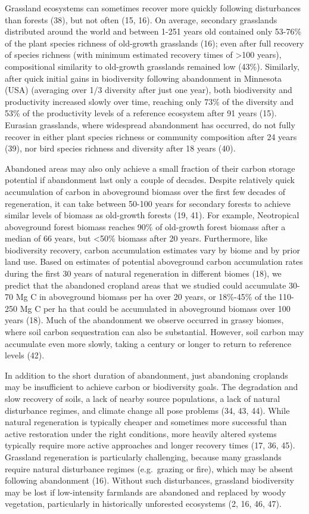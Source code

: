 \documentclass[9pt,twocolumn,twoside,]{pnas-new}
\begin{document}
Grassland ecosystems can sometimes recover more quickly following
disturbances than forests (38), but not often (15, 16). On average,
secondary grasslands distributed around the world and between 1-251
years old contained only 53-76\% of the plant species richness of
old-growth grasslands (16); even after full recovery of species richness
(with minimum estimated recovery times of \textgreater100 years),
compositional similarity to old-growth grasslands remained low (43\%).
Similarly, after quick initial gains in biodiversity following
abandonment in Minnesota (USA) (averaging over 1/3 diversity after just
one year), both biodiversity and productivity increased slowly over
time, reaching only 73\% of the diversity and 53\% of the productivity
levels of a reference ecosystem after 91 years (15). Eurasian
grasslands, where widespread abandonment has occurred, do not fully
recover in either plant species richness or community composition after
24 years (39), nor bird species richness and diversity after 18 years
(40).

Abandoned areas may also only achieve a small fraction of their carbon
storage potential if abandonment last only a couple of decades. Despite
relatively quick accumulation of carbon in aboveground biomass over the
first few decades of regeneration, it can take between 50-100 years for
secondary forests to achieve similar levels of biomass as old-growth
forests (19, 41). For example, Neotropical aboveground forest biomass
reaches 90\% of old-growth forest biomass after a median of 66 years,
but \textless50\% biomass after 20 years. Furthermore, like biodiversity
recovery, carbon accumulation estimates vary by biome and by prior land
use. Based on estimates of potential aboveground carbon accumulation
rates during the first 30 years of natural regeneration in different
biomes (18), we predict that the abandoned cropland areas that we
studied could accumulate 30-70 Mg C in aboveground biomass per ha over
20 years, or 18\%-45\% of the 110-250 Mg C per ha that could be
accumulated in aboveground biomass over 100 years (18). Much of the
abandonment we observe occurred in grassy biomes, where soil carbon
sequestration can also be substantial. However, soil carbon may
accumulate even more slowly, taking a century or longer to return to
reference levels (42).

In addition to the short duration of abandonment, just abandoning
croplands may be insufficient to achieve carbon or biodiversity goals.
The degradation and slow recovery of soils, a lack of nearby source
populations, a lack of natural disturbance regimes, and climate change
all pose problems (34, 43, 44). While natural regeneration is typically
cheaper and sometimes more successful than active restoration under the
right conditions, more heavily altered systems typically require more
active approaches and longer recovery times (17, 36, 45). Grassland
regeneration is particularly challenging, because many grasslands
require natural disturbance regimes (e.g.~grazing or fire), which may be
absent following abandonment (16). Without such disturbances, grassland
biodiversity may be lost if low-intensity farmlands are abandoned and
replaced by woody vegetation, particularly in historically unforested
ecosystems (2, 16, 46, 47).
\end{document}
